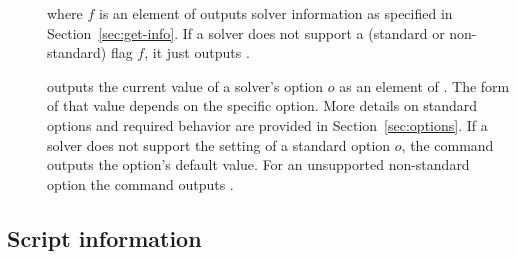 \begin{description}

%
\item[] where $f$ is an element of 
outputs solver information as specified in Section~\ref{sec:get-info}.
If a solver does not support a (standard or non-standard) flag $f$,
it just outputs . 
\smallskip

%
\item[] 
outputs the current value of a solver's option $o$
as an element of .
The form of that value depends on the specific option.
More details on standard options and required behavior are provided 
in Section~\ref{sec:options}.  
If a solver does not support the setting of a standard option $o$,
the command outputs the option's default value.
For an unsupported non-standard option the command outputs .  
\end{description}


\subsection{Script information} \label{sec:script-info}

